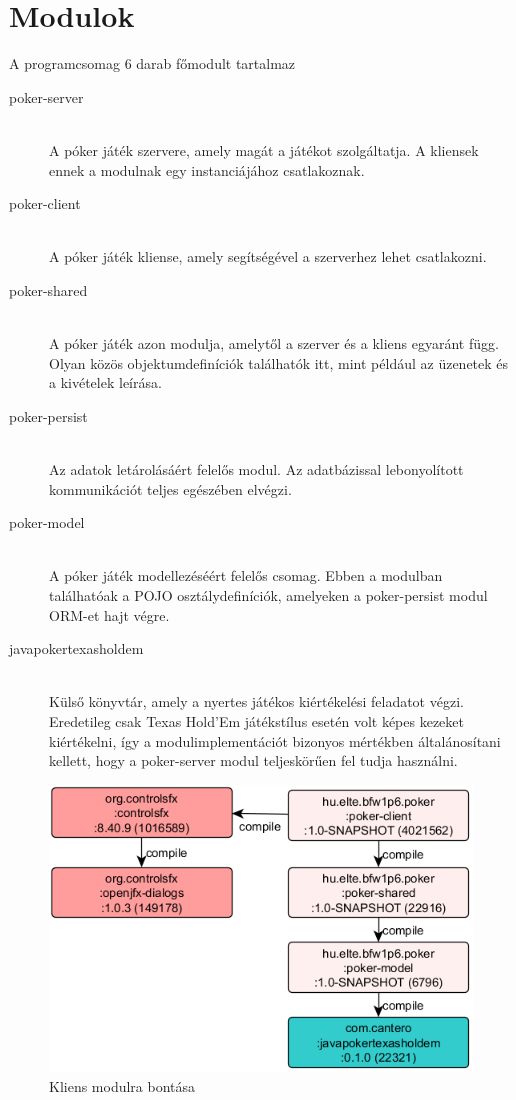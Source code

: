 \section{Modulok}
A programcsomag 6 darab főmodult tartalmaz
\begin{description}
  \item[poker-server] \hfill \\
  A póker játék szervere, amely magát a játékot szolgáltatja. A kliensek ennek a modulnak egy instanciájához csatlakoznak.
  \item[poker-client] \hfill \\
  A póker játék kliense, amely segítségével a szerverhez lehet csatlakozni.
  \item[poker-shared] \hfill \\
   A póker játék azon modulja, amelytől a szerver és a kliens egyaránt függ. Olyan közös objektumdefiníciók találhatók itt, mint például az üzenetek és a kivételek leírása.
   \item[poker-persist] \hfill \\
   Az adatok letárolásáért felelős modul. Az adatbázissal lebonyolított kommunikációt teljes egészében elvégzi.
   \item[poker-model] \hfill \\
   A póker játék modellezéséért felelős csomag. Ebben a modulban találhatóak a POJO \cite{pojo} osztálydefiníciók, amelyeken a poker-persist modul ORM-et \cite{orm} hajt végre.
   \item[javapokertexasholdem] \hfill \\
   Külső könyvtár, amely a nyertes játékos kiértékelési feladatot végzi. Eredetileg csak Texas Hold'Em játékstílus esetén volt képes kezeket kiértékelni, így a modulimplementációt bizonyos mértékben általánosítani kellett, hogy a poker-server modul teljeskörűen fel tudja használni.
\end{description}
\begin{figure}[h!]
	\caption{Kliens modulra bontása}
	\label{fig:client_modul}
	\centering
	\includegraphics{user-documentation/images/poker-client-deps.png}
\end{figure}
